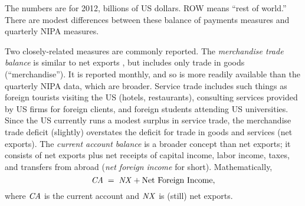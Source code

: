 \begin{table}[b!]
\centering
\caption{US balance of payments. }

\begin{minipage}{0.80\textwidth}
\footnotesize{The numbers are for 2012, billions of US dollars.
ROW means ``rest of world.''
There are modest differences between these balance of payments measures and quarterly NIPA measures.}
\end{minipage}
\label{tab:usbop}
\end{table}

Two closely-related measures are commonly reported.  The {\it
merchandise trade balance\/} is similar to net exports
, but includes only trade in goods (``merchandise'').  It is reported monthly, and
so is more readily available than the quarterly NIPA data, which are broader.
Service trade includes such things as foreign tourists visiting the US (hotels,
restaurants), consulting services provided by US firms for foreign
clients, and foreign students attending US universities. Since the
US currently runs a modest surplus in service trade, the merchandise
trade deficit (slightly) overstates the deficit for trade in goods
and services (net exports).
The {\it current account balance\/} is a broader concept than net exports;
it consists of net exports plus net receipts of capital income, labor
income, taxes, and transfers from abroad
({\it net foreign income\/} for short).
Mathematically,
\[
    \mbox{\em CA\/} \;=\; \mbox{\em NX\/} + \mbox{Net Foreign Income} ,
\]
where $\mbox{\em CA\/}$ is the current account and $\mbox{\em NX\/}$ is (still) net exports.


